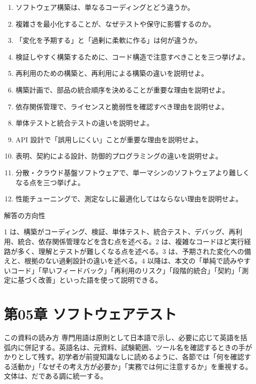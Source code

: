 \documentclass[a4paper,11pt]{ltjsarticle}
\numberwithin{figure}{section}
\numberwithin{table}{section}
\begin{document}
\begin{enumerate}
  \item ソフトウェア構築は、単なるコーディングとどう違うか。
  \item 複雑さを最小化することが、なぜテストや保守に影響するのか。
  \item 「変化を予期する」と「過剰に柔軟に作る」は何が違うか。
  \item 検証しやすく構築するために、コード構造で注意すべきことを三つ挙げよ。
  \item 再利用のための構築と、再利用による構築の違いを説明せよ。
  \item 構築計画で、部品の統合順序を決めることが重要な理由を説明せよ。
  \item 依存関係管理で、ライセンスと脆弱性を確認すべき理由を説明せよ。
  \item 単体テストと統合テストの違いを説明せよ。
  \item API 設計で「誤用しにくい」ことが重要な理由を説明せよ。
  \item 表明、契約による設計、防御的プログラミングの違いを説明せよ。
  \item 分散・クラウド基盤ソフトウェアで、単一マシンのソフトウェアより難しくなる点を三つ挙げよ。
  \item 性能チューニングで、測定なしに最適化してはならない理由を説明せよ。
\end{enumerate}

\begin{plainbox}
解答の方向性

1 は、構築がコーディング、検証、単体テスト、統合テスト、デバッグ、再利用、統合、依存関係管理などを含む点を述べる。2 は、複雑なコードほど実行経路が多く、理解とテストが難しくなる点を述べる。3 は、予期された変化への備えと、根拠のない過剰設計の違いを述べる。4 以降は、本文の「単純で読みやすいコード」「早いフィードバック」「再利用のリスク」「段階的統合」「契約」「測定に基づく改善」といった語を使って説明できる。
\end{plainbox}

\section{第05章 ソフトウェアテスト}
\begin{pointbox}{この資料の読み方}
専門用語は原則として日本語で示し、必要に応じて英語を括弧内に併記する。英語名は、元資料、試験範囲、ツール名を確認するときの手がかりとして残す。初学者が前提知識なしに読めるように、各節では「何を確認する活動か」「なぜその考え方が必要か」「実務では何に注意するか」を重視する。文体は、だである調に統一する。
\end{pointbox}
\end{document}
